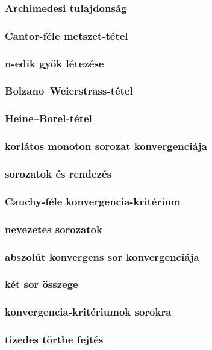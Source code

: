 \documentclass[12pt]{article}
\begin{document}
\subsubsection{Archimedesi tulajdonság}
\subsubsection{Cantor-féle metszet-tétel}
\subsubsection{n-edik gyök létezése}
\subsubsection{Bolzano–Weierstrass-tétel}
\subsubsection{Heine–Borel-tétel}
\subsubsection{korlátos monoton sorozat konvergenciája}
\subsubsection{sorozatok és rendezés}
\subsubsection{Cauchy-féle konvergencia-kritérium}
\subsubsection{nevezetes sorozatok}
\subsubsection{abszolút konvergens sor konvergenciája}
\subsubsection{két sor összege}
\subsubsection{konvergencia-kritériumok sorokra}
\subsubsection{tizedes törtbe fejtés}
\end{document}
